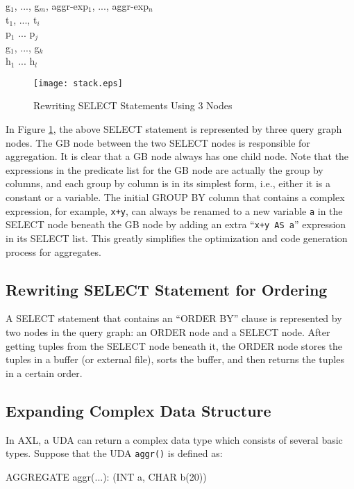 {\footnotesize
\begin{codedisplay}
\> g$_1$, ..., g$_m$, aggr-exp$_1$, ..., aggr-exp$_n$\\
\> t$_1$, ..., t$_i$\\
\> p$_1$  ...  p$_j$\\
\> g$_1$, ...,  g$_k$\\
\> h$_1$  ...  h$_l$
\end{codedisplay}
}

\begin{figure}[!htb]
\centering
\texttt{[image: stack.eps]}
\caption{Rewriting SELECT Statements Using 3 Nodes}
\label{fig:stack}
\end{figure}
  
In Figure \ref{fig:stack}, the above SELECT statement is represented
by three query graph nodes. The GB node between the two SELECT nodes
is responsible for aggregation. It is clear that a GB node always has
one child node. Note that the expressions in the predicate list for
the GB node are actually the group by columns, and each group by
column is in its simplest form, i.e., either it is a constant or a
variable. The initial GROUP BY column that contains a complex
expression, for example, {\tt x+y}, can always be renamed to a new
variable {\tt a} in the SELECT node beneath the GB node by adding an
extra ``{\tt x+y AS a}'' expression in its SELECT list. This greatly
simplifies the optimization and code generation process for
aggregates.

\subsection{Rewriting SELECT Statement for Ordering}
A SELECT statement that contains an ``ORDER BY'' clause is represented
by two nodes in the query graph: an ORDER node and a SELECT node.
After getting tuples from the SELECT node beneath it, the ORDER node
stores the tuples in a buffer (or external file), sorts the buffer,
and then returns the tuples in a certain order.

\subsection{Expanding Complex Data Structure}
In AXL, a UDA can return a complex data type which consists of several
basic types. Suppose that the UDA {\tt aggr()} is defined as:

\begin{codedisplay}
AGGREGATE aggr(...): (INT a, CHAR b(20))
\end{codedisplay}

